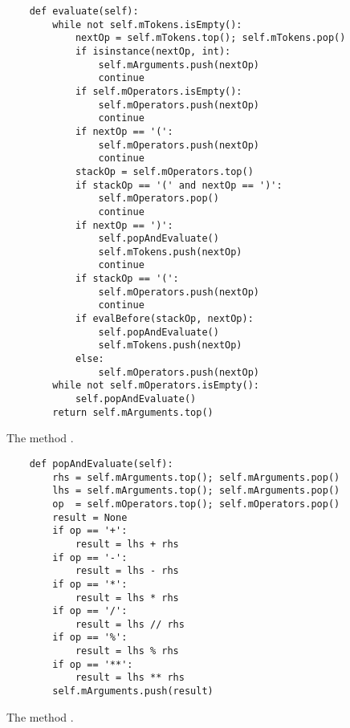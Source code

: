 \begin{figure}[!ht]
  \centering
\begin{verbatim}
    def evaluate(self):
        while not self.mTokens.isEmpty():
            nextOp = self.mTokens.top(); self.mTokens.pop()
            if isinstance(nextOp, int):
                self.mArguments.push(nextOp)
                continue
            if self.mOperators.isEmpty():
                self.mOperators.push(nextOp)
                continue
            if nextOp == '(':
                self.mOperators.push(nextOp)
                continue
            stackOp = self.mOperators.top()
            if stackOp == '(' and nextOp == ')':
                self.mOperators.pop()
                continue
            if nextOp == ')':
                self.popAndEvaluate()
                self.mTokens.push(nextOp)
                continue
            if stackOp == '(':
                self.mOperators.push(nextOp)
                continue
            if evalBefore(stackOp, nextOp):
                self.popAndEvaluate()
                self.mTokens.push(nextOp)
            else:
                self.mOperators.push(nextOp)
        while not self.mOperators.isEmpty():
            self.popAndEvaluate()
        return self.mArguments.top()
\end{verbatim}
\vspace*{-0.3cm}
  \caption{The method .}
  \label{fig:evaluate}
\end{figure} 

\begin{figure}[!ht]
\centering
\begin{verbatim}
    def popAndEvaluate(self):
        rhs = self.mArguments.top(); self.mArguments.pop()
        lhs = self.mArguments.top(); self.mArguments.pop()
        op  = self.mOperators.top(); self.mOperators.pop()
        result = None
        if op == '+':
            result = lhs + rhs
        if op == '-':
            result = lhs - rhs
        if op == '*':
            result = lhs * rhs
        if op == '/':
            result = lhs // rhs
        if op == '%':
            result = lhs % rhs
        if op == '**':
            result = lhs ** rhs
        self.mArguments.push(result)                
\end{verbatim}
\vspace*{-0.3cm}
\caption{The method .}
\label{fig:popAndEvaluate}
\end{figure}

